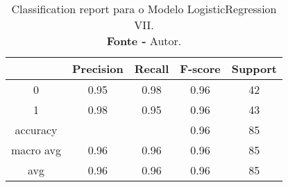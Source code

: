 % 
\begin{table}[H]
    \centering
    \begin{tabular}{@{}ccccc@{}}
    \toprule
     & \textbf{Precision} & \textbf{Recall} &\textbf{F-score} & \textbf{Support} \\ \midrule 
    0 & 0.95 & 0.98 & 0.96 & 42 \\ 
    1 & 0.98 & 0.95 & 0.96 & 43 \\ 
    accuracy &  &  & 0.96 & 85 \\ 
    macro avg & 0.96 & 0.96 & 0.96 & 85 \\ 
    avg & 0.96 & 0.96 & 0.96 & 85 \\ \bottomrule 
    \end{tabular}
    \caption{Classification report para o Modelo LogisticRegression VII. \\ \textbf{Fonte -} Autor.}
    \label{tab: classification-report-Modelo LogisticRegression VII}
\end{table}